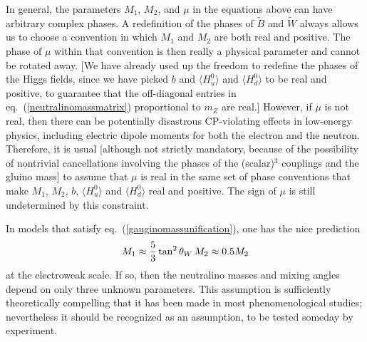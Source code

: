 \documentclass[11pt]{article}
\def\beq{\begin{eqnarray}}
\def\eeq{\end{eqnarray}}
\def\stilde{\widetilde}
\begin{document}
In general, the parameters $M_1$, $M_2$, and $\mu$ in the equations above 
can have arbitrary complex phases. A redefinition of the phases of 
$\stilde B$ and $\stilde W$ always allows us to choose a convention in 
which $M_1$ and $M_2$ are both real and positive. The phase of $\mu$ 
within that convention is then really a physical parameter and cannot be 
rotated away. [We have already used up the freedom to redefine the phases 
of the Higgs fields, since we have picked $b$ and $\langle H_u^0\rangle$ 
and $\langle H_d^0 \rangle$ to be real and positive, to guarantee that the 
off-diagonal entries in eq.~(\ref{neutralinomassmatrix}) proportional to 
$m_Z$ are real.] However, if $\mu$ is not real, then there can be 
potentially disastrous CP-violating effects in low-energy physics, 
including electric dipole moments for both the electron and the neutron. 
Therefore, it is usual [although not strictly mandatory, because of the 
possibility of nontrivial cancellations involving the phases of the 
(scalar)$^3$ couplings and the gluino mass] to assume that $\mu$ is real 
in the same set of phase conventions that make $M_1$, $M_2$, $b$, $\langle 
H_u^0\rangle$ and $\langle H_d^0 \rangle$ real and positive. The sign of 
$\mu$ is still undetermined by this constraint.

In models that satisfy eq.~(\ref{gauginomassunification}), one has the
nice prediction
\beq
M_1 \approx {5\over 3}\tan^2\theta_W \, M_2 \approx 0.5 M_2
\label{usualm1m2}
\eeq
at the electroweak scale. If so, then the neutralino masses and mixing 
angles depend on only three unknown parameters. This assumption is 
sufficiently theoretically compelling that it has been made in most 
phenomenological studies; nevertheless it should be recognized as an 
assumption, to be tested someday by experiment.
\end{document}
